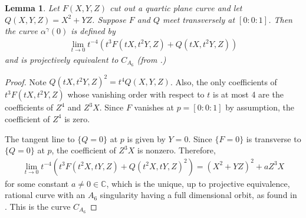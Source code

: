 \documentclass[12 pt, reqno]{amsart}
\newtheorem{lem}[thm]{Lemma}
\theoremstyle{definition}
\newcommand{\mb}{\mathbb}
\renewcommand{\k}{\mathbb{C}}
\begin{document}
\begin{lem}
\label{doubleconic}
Let $F(X,Y,Z)$ cut out a quartic plane curve and let
$Q(X,Y,Z)=X^2+YZ$. Suppose $F$ and $Q$ meet transversely at
$[0:0:1]$. Then the curve $\alpha^{\gamma}(0)$ is defined by
\begin{align*}
  \lim_{t\to 0}t^{-4}(t^3F(tX,t^{2}Y,Z)+Q(tX,t^{2}Y,Z))
\end{align*}
and is projectively equivalent to $C_{A_6}$ (from
.)
\end{lem}

\begin{proof}

Note $Q(tX,t^{2}Y,Z)^2=t^4Q(X,Y,Z)$. Also, the only coefficients of
$t^3F(tX,t^{2}Y,Z)$ whose vanishing order with respect to $t$ is at
most 4 are the coefficients of $Z^4$ and $Z^3 X$. Since $F$ vanishes
at $p=[0:0:1]$ by assumption, the coefficient of $Z^4$ is zero.

The tangent line to $\{Q=0\}$ at $p$ is given by $Y=0$. Since
$\{F=0\}$ is transverse to $\{Q=0\}$ at $p$, the coefficient of $Z^3X$
is nonzero. Therefore,
\begin{align*}
  \lim_{t\to 0}t^{-4}(t^3F(t^2X,tY,Z)+Q(t^2X,tY,Z)^2)=(X^2+YZ)^2+aZ^3X
\end{align*}
for some constant $a\neq 0 \in \k$, which is the unique, up to
projective equivalence, rational curve with an $A_6$ singularity
having a full dimensional orbit, as found in \cite[Example
5.4]{AF00}. This is the curve $C_{A_{6}}$
\end{proof}
\end{document}
